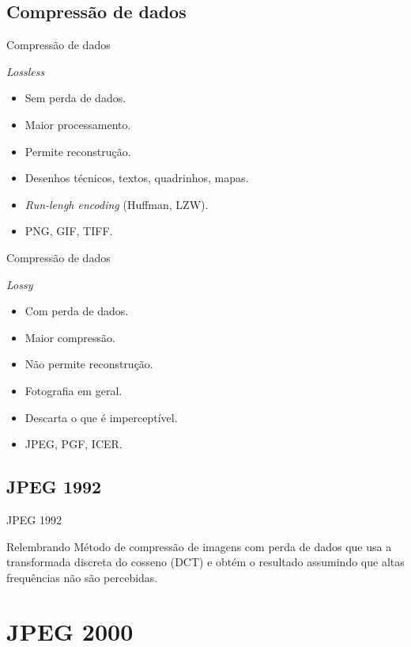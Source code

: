 \documentclass{beamer}
\begin{document}
\subsection{Compressão de dados}
\begin{frame}{Compressão de dados}
   \begin{block}{\textit{Lossless}}
      \begin{itemize}
         \item Sem perda de dados.
         \item Maior processamento.
         \item Permite reconstrução.
         \item Desenhos técnicos, textos, quadrinhos, mapas.
         \item \emph{Run-lengh encoding} (Huffman, LZW).
         \item PNG, GIF, TIFF.
      \end{itemize}
   \end{block}
\end{frame}
\begin{frame}{Compressão de dados}
   \begin{block}{\textit{Lossy}}
      \begin{itemize}
         \item Com perda de dados.
         \item Maior compressão.
         \item Não permite reconstrução.
         \item Fotografia em geral.
         \item Descarta o que é imperceptível.
         \item JPEG, PGF, ICER.
      \end{itemize}
   \end{block}
\end{frame}
\subsection{JPEG 1992}
\begin{frame}{JPEG 1992}
   \begin{block}{Relembrando}
      Método de compressão de imagens com perda de dados que usa a transformada discreta do cosseno (DCT) e obtém o resultado assumindo que altas frequências não são percebidas.
   \end{block}
\end{frame}
\section{JPEG 2000}
\end{document}
